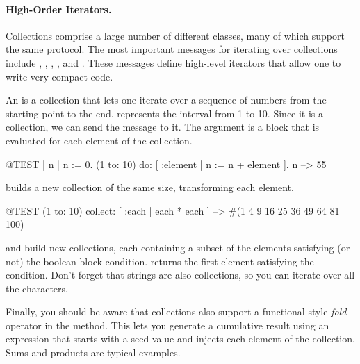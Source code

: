 \documentclass[a4paper,10pt,twoside]{book}
\begin{document}
\paragraph{High-Order Iterators.}
Collections comprise a large number of different classes, many of which support the same protocol.
The most important messages for iterating over collections include
, , , ,  and .
These messages define high-level iterators that allow one to write very compact code.

An  is a collection that lets one iterate over a sequence of numbers from the starting point to the end.
 represents the interval from 1 to 10.
Since it is a collection, we can send the message  to it.
The argument is a block that is evaluated for each element of the collection.

\begin{code}{@TEST | n |}
n := 0.
(1 to: 10) do: [ :element | n := n + element ].
n --> 55
\end{code}

 builds a new collection of the same size, transforming each element.
\begin{code}{@TEST}
(1 to: 10) collect: [ :each | each * each ] --> #(1 4 9 16 25 36 49 64 81 100)
\end{code}

 and  build new collections, each containing a subset of the elements satisfying (or not) the boolean block condition.
 returns the first element satisfying the condition.
Don't forget that strings are also collections, so you can iterate over all the characters.


Finally, you should be aware that collections also support a functional-style \emph{fold} operator in the  method.
This lets you generate a cumulative result using an expression that starts with a seed value and injects each element of the collection.
Sums and products are typical examples.
\end{document}
